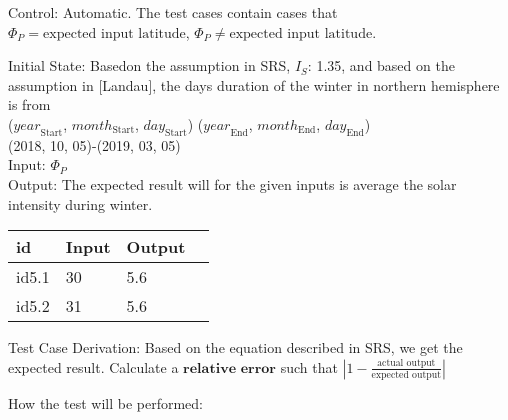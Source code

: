 \documentclass[12pt, titlepage]{article}
\begin{document}
\begin{enumerate}
Control: Automatic. The test cases contain cases that $\Phi_P = \text{expected
input latitude}$, $\Phi_P \ne \text{expected input latitude}$. 

Initial State:
Basedon the assumption in SRS\cite{YS2019}, $I_{S}$: 1.35, and based on the
assumption in [Landau]\cite{Charles2001}, the days duration of the winter in
northern hemisphere is from\\
($\mathit{year}_\text{Start}$, $\mathit{month}_\text{Start}$, $\mathit{day}_\text{Start}$)  ($\mathit{year}_\text{End}$, $\mathit{month}_\text{End}$, $\mathit{day}_\text{End}$)\\ 
(2018, 10, 05)-(2019, 03, 05)
\\


Input: $\Phi_P$\\


Output: The expected result will for the given inputs is average the solar
intensity during winter.\\ 

\noindent \begin{tabular}{l l l l} 
    \toprule		
    \textbf{id} & \textbf{Input} & \textbf{Output}\\ 
	\midrule
   id5.1 & 30 & 5.6\\
   id5.2 & 31 & 5.6\\
    \bottomrule
  \end{tabular}



Test Case Derivation: Based on the equation described in SRS\cite{YS2019}, we get the expected result. Calculate a $\textbf{relative error}$ such that $| 1 - \frac{\text{actual output}}{ \text{expected
output}} |$  


How the test will be performed: 


\end{enumerate}
\end{document}
